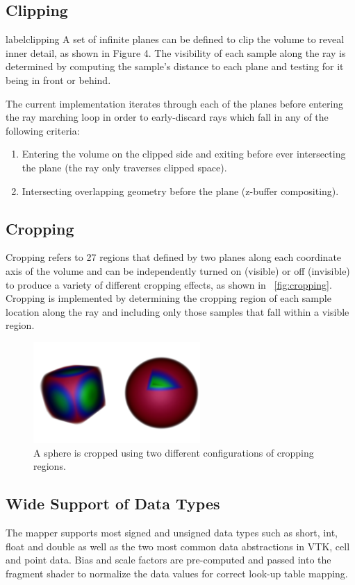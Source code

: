 \subsection{Clipping}
label{clipping}
A set of infinite planes can be defined to clip the volume to reveal inner
detail, as shown in Figure 4.  The visibility of each sample along the ray
is determined by computing the sample's distance to each plane and testing
for it being in front or behind.

The current implementation iterates through each of the planes before entering
the ray marching loop in order to early-discard rays which fall in any of the
following criteria:

\begin{enumerate}
\item Entering the volume on the clipped side and exiting before ever
	intersecting the plane (the ray only traverses clipped space).
\item Intersecting overlapping geometry before the plane (z-buffer compositing).
\end{enumerate}

\subsection{Cropping} Cropping refers to 27 regions that defined by two
planes along each coordinate axis of the volume and can be independently turned
on (visible) or off (invisible) to produce a variety of different cropping
effects, as shown in ~\autoref{fig:cropping}. Cropping is implemented by
determining the cropping region of each sample location along the ray and
including only those samples that fall within a visible region.

\begin{figure}[htb]
  \centering
  \includegraphics[width=2.5in]{SphereCropping.png}
  \caption{A sphere is cropped using two different configurations of cropping regions.}
  \label{fig:cropping}
\end{figure}

\subsection{Wide Support of Data Types}
The mapper supports most signed and unsigned data types such as short, int,
float and double as well as the two most common data abstractions in VTK,
cell and point data.  Bias and scale factors are pre-computed and passed into
the fragment shader to normalize the data values for correct look-up table
mapping.

